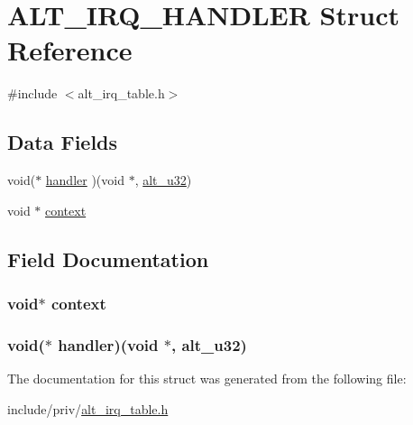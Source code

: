 \hypertarget{struct_a_l_t___i_r_q___h_a_n_d_l_e_r}{\section{\-A\-L\-T\-\_\-\-I\-R\-Q\-\_\-\-H\-A\-N\-D\-L\-E\-R \-Struct \-Reference}
\label{struct_a_l_t___i_r_q___h_a_n_d_l_e_r}
}


{\ttfamily \#include $<$alt\-\_\-irq\-\_\-table.\-h$>$}

\subsection*{\-Data \-Fields}
\begin{DoxyCompactItemize}
\item 
void($\ast$ \hyperlink{struct_a_l_t___i_r_q___h_a_n_d_l_e_r_a69e00bb873ee94f64560935634997e77}{handler} )(void $\ast$, \hyperlink{alt__types_8h_acd6a6a2004f05f01beaa42367510d8af}{alt\-\_\-u32})
\item 
void $\ast$ \hyperlink{struct_a_l_t___i_r_q___h_a_n_d_l_e_r_ae376f130b17d169ee51be68077a89ed0}{context}
\end{DoxyCompactItemize}


\subsection{\-Field \-Documentation}
\hypertarget{struct_a_l_t___i_r_q___h_a_n_d_l_e_r_ae376f130b17d169ee51be68077a89ed0}{
\subsubsection[{context}]{\setlength{\rightskip}{0pt plus 5cm}void$\ast$ {\bf context}}}\label{struct_a_l_t___i_r_q___h_a_n_d_l_e_r_ae376f130b17d169ee51be68077a89ed0}
\hypertarget{struct_a_l_t___i_r_q___h_a_n_d_l_e_r_a69e00bb873ee94f64560935634997e77}{
\subsubsection[{handler}]{\setlength{\rightskip}{0pt plus 5cm}void($\ast$ {\bf handler})(void $\ast$, {\bf alt\-\_\-u32})}}\label{struct_a_l_t___i_r_q___h_a_n_d_l_e_r_a69e00bb873ee94f64560935634997e77}


\-The documentation for this struct was generated from the following file\-:\begin{DoxyCompactItemize}
\item 
include/priv/\hyperlink{alt__irq__table_8h}{alt\-\_\-irq\-\_\-table.\-h}\end{DoxyCompactItemize}
